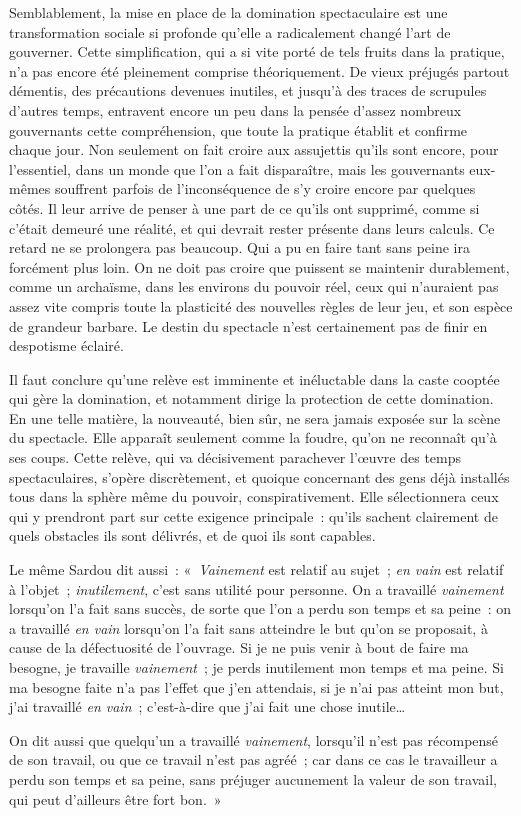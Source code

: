 \documentclass[french,twoside]{book} %
\def\mednobreak{\ifdim\lastskip<\medskipamount
  \removelastskip\nopagebreak\medskip\fi}
\newcommand{\labelblock}[1]{\medbreak{\noindent\color{rubric}\bfseries #1}\par\mednobreak}
\begin{document}
Semblablement, la mise en place de la domination spectaculaire est une transformation sociale si profonde qu’elle a radicalement changé l’art de gouverner. Cette simplification, qui a si vite porté de tels fruits dans la pratique, n’a pas encore été pleinement comprise théoriquement. De vieux préjugés partout démentis, des précautions devenues inutiles, et jusqu’à des traces de scrupules d’autres temps, entravent encore un peu dans la pensée d’assez nombreux gouvernants cette compréhension, que toute la pratique établit et confirme chaque jour. Non seulement on fait croire aux assujettis qu’ils sont encore, pour l’essentiel, dans un monde que l’on a fait disparaître, mais les gouvernants eux-mêmes souffrent parfois de l’inconséquence de s’y croire encore par quelques côtés. Il leur arrive de penser à une part de ce qu’ils ont supprimé, comme si c’était demeuré une réalité, et qui devrait rester présente dans leurs calculs. Ce retard ne se prolongera pas beaucoup. Qui a pu en faire tant sans peine ira forcément plus loin. On ne doit pas croire que puissent se maintenir durablement, comme un archaïsme, dans les environs du pouvoir réel, ceux qui n’auraient pas assez vite compris toute la plasticité des nouvelles règles de leur jeu, et son espèce de grandeur barbare. Le destin du spectacle n’est certainement pas de finir en despotisme éclairé.\par
Il faut conclure qu’une relève est imminente et inéluctable dans la caste cooptée qui gère la domination, et notamment dirige la protection de cette domination. En une telle matière, la nouveauté, bien sûr, ne sera jamais exposée sur la scène du spectacle. Elle apparaît seulement comme la foudre, qu’on ne reconnaît qu’à ses coups. Cette relève, qui va décisivement parachever l’œuvre des temps spectaculaires, s’opère discrètement, et quoique concernant des gens déjà installés tous dans la sphère même du pouvoir, conspirativement. Elle sélectionnera ceux qui y prendront part sur cette exigence principale : qu’ils sachent clairement de quels obstacles ils sont délivrés, et de quoi ils sont capables.\par

\labelblock{XXXIII}

\noindent Le même Sardou dit aussi : « \emph{Vainement} est relatif au sujet ; \emph{en vain} est relatif à l’objet ; \emph{inutilement}, c’est sans utilité pour personne. On a travaillé \emph{vainement} lorsqu’on l’a fait sans succès, de sorte que l’on a perdu son temps et sa peine : on a travaillé \emph{en vain} lorsqu’on l’a fait sans atteindre le but qu’on se proposait, à cause de la défectuosité de l’ouvrage. Si je ne puis venir à bout de faire ma besogne, je travaille \emph{vainement} ; je perds inutilement mon temps et ma peine. Si ma besogne faite n’a pas l’effet que j’en attendais, si je n’ai pas atteint mon but, j’ai travaillé \emph{en vain} ; c’est-à-dire que j’ai fait une chose inutile…\par
On dit aussi que quelqu’un a travaillé \emph{vainement}, lorsqu’il n’est pas récompensé de son travail, ou que ce travail n’est pas agréé ; car dans ce cas le travailleur a perdu son temps et sa peine, sans préjuger aucunement la valeur de son travail, qui peut d’ailleurs être fort bon. »\par
\end{document}
